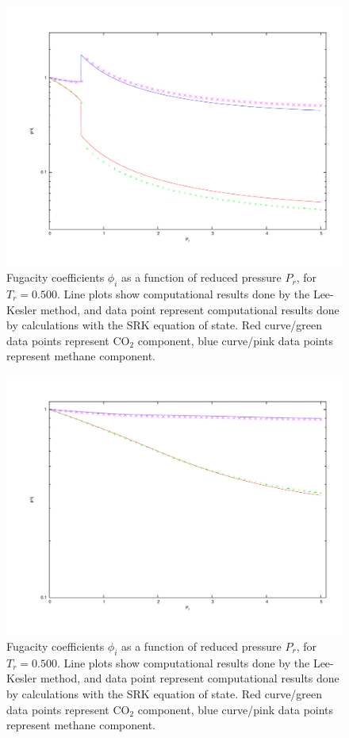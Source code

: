 \documentclass[internal,english]{sintefmemo2012}
\numberwithin{equation}{section}
\begin{document}
\begin{figure}
	\centering
	\includegraphics[trim = 1.5cm 2cm 0 1cm, clip = true, width=12.5cm]{fug09Tc}
	\caption{Fugacity coefficients $\phi_i$ as a function of reduced pressure $P_r$, for $T_r = 0.500$. Line plots show computational results done by the Lee-Kesler method, and data point represent computational results done by calculations with the SRK equation of state. Red curve/green data points represent CO$_2$ component, blue curve/pink data points represent methane component.}
		\label{fig:fug09Tc}
\end{figure}

\begin{figure}
	\centering
	\includegraphics[trim = 1.5cm 2cm 0 1cm, clip = true, width=12.5cm]{fug13Tc}
	\caption{Fugacity coefficients $\phi_i$ as a function of reduced pressure $P_r$, for $T_r = 0.500$. Line plots show computational results done by the Lee-Kesler method, and data point represent computational results done by calculations with the SRK equation of state. Red curve/green data points represent CO$_2$ component, blue curve/pink data points represent methane component.}
	\label{fig:fug13Tc}
\end{figure}
\end{document}
